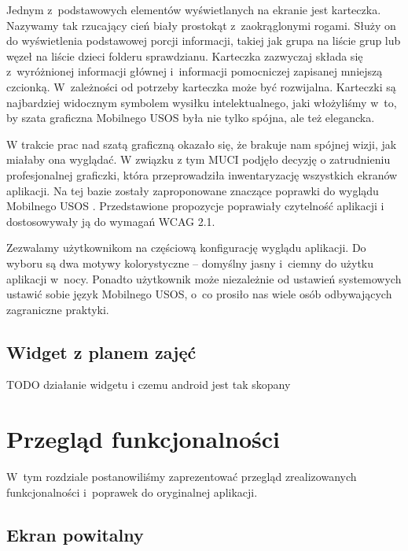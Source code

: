 \documentclass{pracamgr}
\begin{document}
Jednym z~podstawowych elementów wyświetlanych na ekranie jest karteczka. Nazywamy
tak rzucający cień biały prostokąt z~zaokrąglonymi rogami. Służy on do wyświetlenia
podstawowej porcji informacji, takiej jak grupa na liście grup lub węzeł na liście
dzieci folderu sprawdzianu. Karteczka zazwyczaj składa się z~wyróżnionej informacji
głównej i~informacji pomocniczej zapisanej mniejszą czcionką. W~zależności od potrzeby
karteczka może być rozwijalna. Karteczki są najbardziej widocznym symbolem wysiłku
intelektualnego, jaki włożyliśmy w~to, by szata graficzna Mobilnego USOS była nie
tylko spójna, ale też elegancka.

W trakcie prac nad szatą graficzną okazało się, że brakuje nam spójnej wizji, jak
miałaby ona wyglądać. W związku z tym MUCI podjęło decyzję o zatrudnieniu profesjonalnej
graficzki, która przeprowadziła inwentaryzację wszystkich ekranów aplikacji. Na tej
bazie zostały zaproponowane znaczące poprawki do wyglądu Mobilnego USOS \cite{propozycjaszaty}.
Przedstawione propozycje poprawiały czytelność aplikacji i dostosowywały ją do
wymagań WCAG 2.1.

Zezwalamy użytkownikom na częściową konfigurację wyglądu aplikacji. Do wyboru są
dwa motywy kolorystyczne -- domyślny jasny i~ciemny do użytku aplikacji w~nocy.
Ponadto użytkownik może niezależnie od ustawień systemowych ustawić sobie język
Mobilnego USOS, o~co prosiło nas wiele osób odbywających zagraniczne praktyki.

\section{Widget z planem zajęć}

TODO działanie widgetu i czemu android jest tak skopany

\chapter{Przegląd funkcjonalności}

W~tym rozdziale postanowiliśmy zaprezentować przegląd zrealizowanych funkcjonalności
i~poprawek do oryginalnej aplikacji.


\section{Ekran powitalny}
\end{document}

